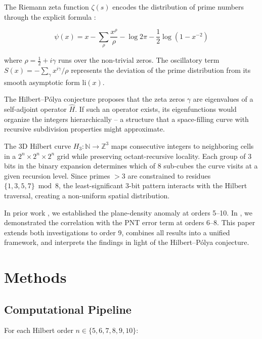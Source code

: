 \documentclass[11pt,a4paper]{article}
\begin{document}
The Riemann zeta function $\zeta(s)$ encodes the distribution of prime
numbers through the explicit formula \cite{riemann1859}:

\begin{equation}
\psi(x) = x - \sum_{\rho} \frac{x^{\rho}}{\rho}
- \log 2\pi - \frac{1}{2}\log(1 - x^{-2})
\label{eq:explicit}
\end{equation}

where $\rho = \frac{1}{2} + i\gamma$ runs over the non-trivial zeros.
The oscillatory term $S(x) = -\sum_\gamma x^{i\gamma}/\rho$ represents
the deviation of the prime distribution from its smooth asymptotic form
$\text{li}(x)$.

The Hilbert--P\'{o}lya conjecture \cite{hilbertpolya} proposes that the
zeta zeros $\gamma$ are eigenvalues of a self-adjoint operator $\hat{H}$.
If such an operator exists, its eigenfunctions would organize the integers
hierarchically -- a structure that a space-filling curve with recursive
subdivision properties might approximate.

The 3D Hilbert curve $H_3: \mathbb{N} \to \mathbb{Z}^3$ maps consecutive
integers to neighboring cells in a $2^n \times 2^n \times 2^n$ grid while
preserving octant-recursive locality. Each group of 3 bits in the binary
expansion determines which of 8 sub-cubes the curve visits at a given
recursion level. Since primes $>3$ are constrained to residues $\{1,3,5,7\}
\bmod 8$, the least-significant 3-bit pattern interacts with the Hilbert
traversal, creating a non-uniform spatial distribution.

In prior work \cite{wesson2026a}, we established the plane-density anomaly
at orders 5--10. In \cite{wesson2026b}, we demonstrated the correlation with
the PNT error term at orders 6--8. This paper extends both investigations
to order 9, combines all results into a unified framework, and interprets
the findings in light of the Hilbert--P\'{o}lya conjecture.

\section{Methods}

\subsection{Computational Pipeline}

For each Hilbert order $n \in \{5, 6, 7, 8, 9, 10\}$:
\end{document}
